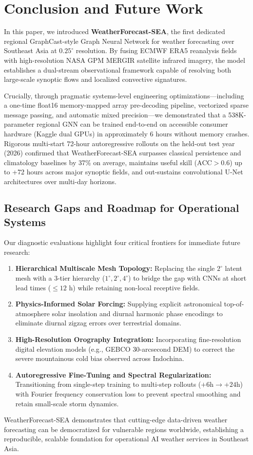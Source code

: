 \section{Conclusion and Future Work}
\label{sec:conclusion}

In this paper, we introduced \textbf{WeatherForecast-SEA}, the first dedicated regional GraphCast-style Graph Neural Network for weather forecasting over Southeast Asia at $0.25^\circ$ resolution. By fusing ECMWF ERA5 reanalysis fields with high-resolution NASA GPM MERGIR satellite infrared imagery, the model establishes a dual-stream observational framework capable of resolving both large-scale synoptic flows and localized convective signatures. 

Crucially, through pragmatic systems-level engineering optimizations—including a one-time float16 memory-mapped array pre-decoding pipeline, vectorized sparse message passing, and automatic mixed precision—we demonstrated that a 538K-parameter regional GNN can be trained end-to-end on accessible consumer hardware (Kaggle dual GPUs) in approximately 6 hours without memory crashes. Rigorous multi-start 72-hour autoregressive rollouts on the held-out test year (2026) confirmed that WeatherForecast-SEA surpasses classical persistence and climatology baselines by 37\% on average, maintains useful skill ($\text{ACC} > 0.6$) up to +72 hours across major synoptic fields, and out-sustains convolutional U-Net architectures over multi-day horizons.

\subsection{Research Gaps and Roadmap for Operational Systems}
Our diagnostic evaluations highlight four critical frontiers for immediate future research:
\begin{enumerate}
    \item \textbf{Hierarchical Multiscale Mesh Topology:} Replacing the single $2^\circ$ latent mesh with a 3-tier hierarchy ($1^\circ, 2^\circ, 4^\circ$) to bridge the gap with CNNs at short lead times ($\le 12\text{ h}$) while retaining non-local receptive fields.
    \item \textbf{Physics-Informed Solar Forcing:} Supplying explicit astronomical top-of-atmosphere solar insolation and diurnal harmonic phase encodings to eliminate diurnal zigzag errors over terrestrial domains.
    \item \textbf{High-Resolution Orography Integration:} Incorporating fine-resolution digital elevation models (e.g., GEBCO 30-arcsecond DEM) to correct the severe mountainous cold bias observed across Indochina.
    \item \textbf{Autoregressive Fine-Tuning and Spectral Regularization:} Transitioning from single-step training to multi-step rollouts ($+6\text{h} \to +24\text{h}$) with Fourier frequency conservation loss to prevent spectral smoothing and retain small-scale storm dynamics.
\end{enumerate}

WeatherForecast-SEA demonstrates that cutting-edge data-driven weather forecasting can be democratized for vulnerable regions worldwide, establishing a reproducible, scalable foundation for operational AI weather services in Southeast Asia.
